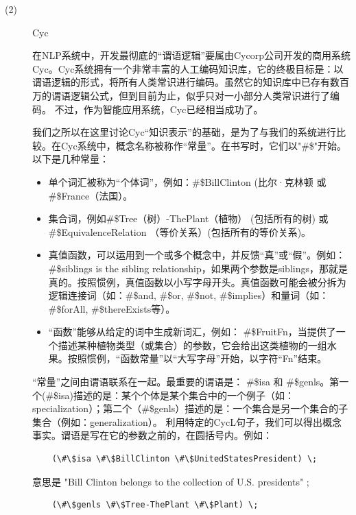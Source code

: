 \begin{enumerate}
\begin{description}
\item[(2)]  Cyc

在NLP系统中，开发最彻底的“谓语逻辑”要属由Cycorp公司开发的商用系统Cyc\cite{Lenat1990}。Cyc系统拥有一个非常丰富的人工编码知识库，它的终极目标是：以谓语逻辑的形式，将所有人类常识进行编码。虽然它的知识库中已存有数百万的谓语逻辑公式，但到目前为止，似乎只对一小部分人类常识进行了编码。 不过，作为智能应用系统，Cyc已经相当成功了。

我们之所以在这里讨论Cyc“知识表示”的基础，是为了与我们的系统进行比较。在Cyc系统中，概念名称被称作“常量”。在书写时，它们以"\#\$"开始。以下是几种常量：

\begin{itemize}
\item 单个词汇被称为“个体词”，例如：\#\$BillClinton (比尔·克林顿 或 \#\$France（法国）。
\item 集合词，例如\#\$Tree（树）-ThePlant（植物） (包括所有的树) 或 \#\$EquivalenceRelation （等价关系）(包括所有的等价关系)。
\item 真值函数，可以运用到一个或多个概念中，并反馈“真”或“假”。例如：\#\$siblings is the sibling relationship，如果两个参数是siblings，那就是真的。按照惯例，真值函数以小写字母开头。真值函数可能会被分拆为逻辑连接词（如：\#\$and, \#\$or, \#\$not, \#\$implies）和量词（如：\#\$forAll, \#\$thereExists等）。
\item “函数”能够从给定的词中生成新词汇，例如：
\#\$FruitFn，当提供了一个描述某种植物类型（或集合）的参数，它会给出这类植物的一组水果。按照惯例，“函数常量”以“大写字母”开始，以字符“Fn”结束。
\end{itemize}

“常量”之间由谓语联系在一起。最重要的谓语是： \#\$isa 和 \#\$genls。第一个(\#\$isa)描述的是：某个个体是某个集合中的一个例子（如：specialization）；第二个（\#\$genls）描述的是：一个集合是另一个集合的子集合（例如：generalization）。
利用特定的CycL句子，我们可以得出概念事实。谓语是写在它的参数之前的，在圆括号内。例如：

 {\tt\begin{small}\begin{lstlisting}
    (\#\$isa \#\$BillClinton \#\$UnitedStatesPresident) \;
    \end{lstlisting}\end{small}}

\noindent 意思是 "Bill Clinton belongs to the collection of U.S. presidents" ;

 {\tt\begin{small}\begin{lstlisting}
    (\#\$genls \#\$Tree-ThePlant \#\$Plant) \;
    \end{lstlisting}\end{small}}


\end{description}
\end{enumerate}
